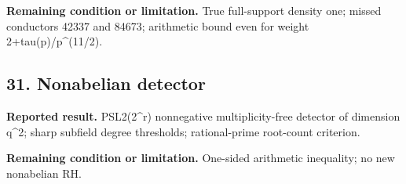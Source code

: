\textbf{Remaining condition or limitation.} True full-support density one; missed conductors 42337 and 84673; arithmetic bound even for weight 2+tau(p)/p\textasciicircum{}(11/2).

\subsection*{31. Nonabelian detector}

\href{https://github.com/VladimirReshetnikov/ProveIt/blob/274841c1cb137aafbb60ab5f519c51fd42eee98e/docs/incoming/psl2_grh_transfer.zip}{}

\textbf{Reported result.} PSL2(2\textasciicircum{}r) nonnegative multiplicity-free detector of dimension q\textasciicircum{}2; sharp subfield degree thresholds; rational-prime root-count criterion.

\textbf{Remaining condition or limitation.} One-sided arithmetic inequality; no new nonabelian RH.

\normalsize
